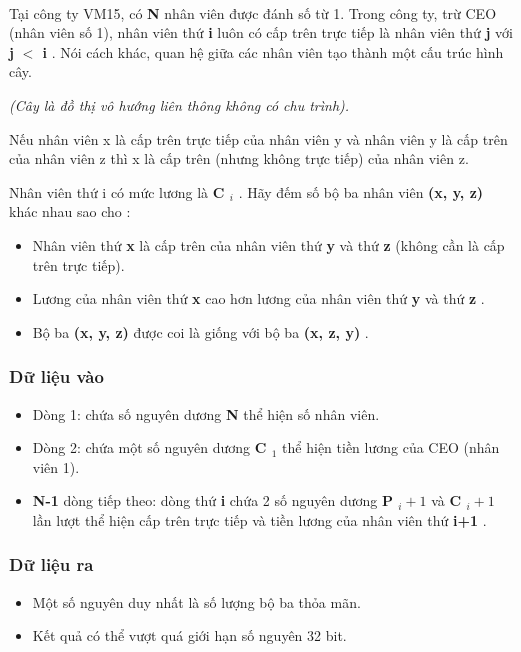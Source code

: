 

 

Tại công ty VM15, có \textbf{ N } nhân viên được đánh số từ 1. Trong công ty, trừ CEO (nhân viên số 1), nhân viên thứ \textbf{ i } luôn có cấp trên trực tiếp là nhân viên thứ \textbf{ j } với \textbf{ j }\textbf{ $<$ i } . Nói cách khác, quan hệ giữa các nhân viên tạo thành một cấu trúc hình cây.

\emph{(Cây là đồ thị vô hướng liên thông không có chu trình). }

Nếu nhân viên x là cấp trên trực tiếp của nhân viên y và nhân viên y là cấp trên của nhân viên z thì x là cấp trên (nhưng không trực tiếp) của nhân viên z.

Nhân viên thứ i có mức lương là \textbf{ C $_ i $} . Hãy đếm số bộ ba nhân viên \textbf{ (x, y, z) } khác nhau sao cho :
\begin{itemize}
	\item Nhân viên thứ \textbf{ x } là cấp trên của nhân viên thứ \textbf{ y } và thứ \textbf{ z } (không cần là cấp trên trực tiếp).
	\item Lương của nhân viên thứ \textbf{ x } cao hơn lương của nhân viên thứ \textbf{ y } và thứ \textbf{ z } .
	\item Bộ ba \textbf{ (x, y, z) } được coi là giống với bộ ba \textbf{ (x, z, y) } .
\end{itemize}

\subsubsection{Dữ liệu vào}
\begin{itemize}
	\item Dòng 1: chứa số nguyên dương \textbf{ N } thể hiện số nhân viên.
	\item Dòng 2: chứa một số nguyên dương \textbf{ C $_ 1 $} thể hiện tiền lương của CEO (nhân viên 1).
	\item \textbf{N-1 } dòng tiếp theo: dòng thứ \textbf{ i } chứa 2 số nguyên dương \textbf{ P $_ i+1 $} và \textbf{ C $_ i+1 $} lần lượt thể hiện cấp trên trực tiếp và tiền lương của nhân viên thứ \textbf{ i+1 } .
\end{itemize}

\subsubsection{Dữ liệu ra}
\begin{itemize}
	\item Một số nguyên duy nhất là số lượng bộ ba thỏa mãn.
	\item Kết quả có thể vượt quá giới hạn số nguyên 32 bit.
\end{itemize}

